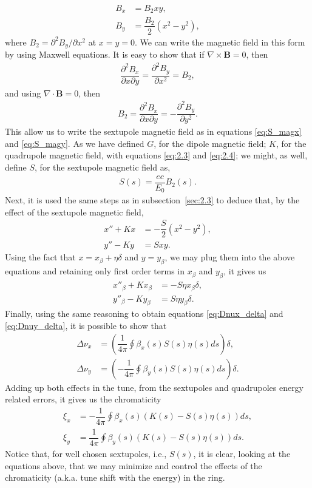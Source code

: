 \begin{align}
	B_x &= B_2 x y, \label{eq:S_magx} \\ 
    B_y &= \dfrac{B_2}{2} (x^2 - y^2),\label{eq:S_magy}
\end{align}
where $B_2 = \partial^2 B_y/\partial x^2$ at $x=y=0$. We can write the magnetic field in this form by using Maxwell equations. It is easy to show that if $\nabla \times \bm{B} = 0$, then
\begin{align*}
	\dfrac{\partial^2 B_x}{\partial x \partial y} = \dfrac{\partial^2 B_y}{\partial x^2} = B_2, 
\end{align*}
and using $\nabla \cdot \bm{B} = 0$, then
\begin{align*}
	B_2 = \dfrac{\partial^2 B_x}{\partial x \partial y} = - \dfrac{\partial^2 B_y}{\partial y^2}.
\end{align*}
This allow us to write the sextupole magnetic field as in equations \eqref{eq:S_magx} and \eqref{eq:S_magy}.
As we have defined $G$, for the dipole magnetic field; $K$, for the quadrupole magnetic field, with equations \eqref{eq:2.3} and \eqref{eq:2.4}; we might, as well, define $S$, for the sextupole magnetic field as,
\begin{align}
	S(s) = \dfrac{ec}{E_0} B_2(s).
\end{align}
Next, it is used the same steps as in subsection~\ref{sec:2.3} to deduce that, by the effect of the sextupole magnetic field,
\begin{align}
	x''+ K x &= - \dfrac{S}{2} (x^2 - y^2),\\
    y''- K y &= S x y.
\end{align}
Using the fact that $x = x_{\beta} + \eta \delta$ and $y = y_{\beta}$, we may plug them into the above equations and retaining only first order terms in $x_{\beta}$ and $y_{\beta}$, it gives us
\begin{align}
	x''_{\beta} + K x_{\beta} &= - S \eta x_{\beta} \delta, \\
    y''_{\beta} - K y_{\beta} &= S \eta y_{\beta} \delta.
\end{align}
Finally, using the same reasoning to obtain equations \eqref{eq:Dnux_delta} and \eqref{eq:Dnuy_delta}, it is possible to show that
\begin{align}
	\Delta\nu_x &= \left( \dfrac{1}{4\pi}\oint\beta_x(s) S(s)\eta(s) ds \right) \delta,\\
    \Delta\nu_y &= \left( -\dfrac{1}{4\pi}\oint\beta_y(s) S(s)\eta(s) ds \right) \delta.
\end{align}
Adding up both effects in the tune, from the sextupoles and quadrupoles energy related errors, it gives us the chromaticity
\begin{align}
	\xi_x &= -\dfrac{1}{4\pi}\oint\beta_x(s)(K(s) - S(s)\eta(s)) ds, \\
    \xi_y &= \dfrac{1}{4\pi}\oint\beta_y(s)(K(s) - S(s)\eta(s)) ds.
\end{align}
Notice that, for well chosen sextupoles, i.e., $S(s)$, it is clear, looking at the equations above, that we may minimize and control the effects of the chromaticity (a.k.a. tune shift with the energy) in the ring.
